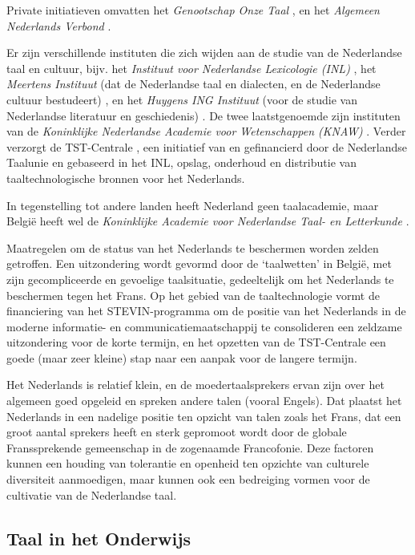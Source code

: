 \begin{multicols}{2}
   Private initiatieven omvatten het \emph{Genootschap Onze Taal} \cite{OT}, en het \emph{Algemeen Nederlands Verbond} \cite{ANV}.

   Er zijn verschillende instituten die zich wijden aan de studie van de Nederlandse taal en cultuur, bijv. het \emph{Instituut voor Nederlandse Lexicologie (INL)} \cite{INL}, het \emph{Meertens Instituut} (dat de Nederlandse taal en dialecten, en de Nederlandse cultuur bestudeert) \cite{MI}, en het \emph{Huygens ING Instituut} (voor de studie van Nederlandse literatuur en geschiedenis) \cite{HING}. De twee laatstgenoemde zijn instituten van de \emph{Koninklijke Nederlandse Academie voor Wetenschappen (KNAW)} \cite{KNAW}.  Verder verzorgt de TST-Centrale \cite{TST-Centrale}, een initiatief van en gefinancierd door de Nederlandse Taalunie en gebaseerd in het INL, opslag, onderhoud en distributie van taaltechnologische bronnen voor het Nederlands.

   In tegenstelling tot andere landen heeft Nederland geen taalacademie, maar Belgi{\"e} heeft wel de \emph{Koninklijke Academie voor Nederlandse Taal- en Letterkunde} \cite{Kantl}.


   Maatregelen om de status van het Nederlands te beschermen worden zelden getroffen. Een uitzondering wordt gevormd door de `taalwetten' in Belgi{\"e}, met zijn gecompliceerde en gevoelige taalsituatie, gedeeltelijk om het Nederlands te beschermen tegen het Frans. Op het gebied van de taaltechnologie vormt de financiering van het STEVIN-programma om de positie van het Nederlands in de moderne informatie- en communicatiemaatschappij te consolideren een zeldzame uitzondering voor de korte termijn, en het opzetten van de TST-Centrale een goede (maar zeer kleine) stap naar een aanpak voor de langere termijn.

   Het Nederlands is relatief klein, en de moedertaalsprekers ervan zijn over het algemeen goed opgeleid en spreken andere talen (vooral Engels). Dat plaatst het Nederlands in een nadelige positie ten opzicht van talen zoals het Frans, dat een groot aantal sprekers heeft en sterk gepromoot wordt door de globale Franssprekende gemeenschap in de zogenaamde Francofonie. Deze factoren kunnen een houding van tolerantie en openheid ten opzichte van culturele diversiteit aanmoedigen, maar kunnen ook een bedreiging vormen voor de cultivatie van de Nederlandse taal.

\subsection{Taal in het Onderwijs}


\end{multicols}

